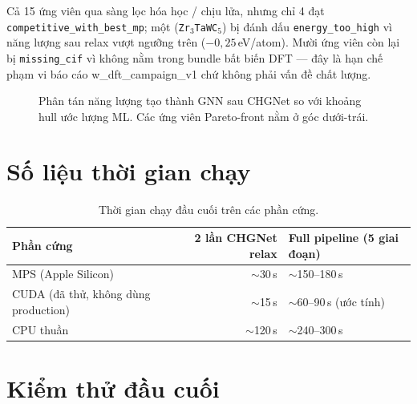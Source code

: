 \documentclass[11pt,a4paper]{report}
\newcommand{\eV}{eV/atom}
\begin{document}
Cả 15 ứng viên qua sàng lọc hóa học / chịu lửa, nhưng chỉ 4 đạt \texttt{competitive\_with\_best\_mp};
một (\texttt{Zr$_3$TaWC$_5$}) bị đánh dấu \texttt{energy\_too\_high} vì năng lượng sau relax vượt
ngưỡng trên ($-0{,}25$\,\eV{}). Mười ứng viên còn lại bị \texttt{missing\_cif} vì không nằm
trong bundle bất biến DFT — đây là hạn chế phạm vi báo cáo w\_dft\_campaign\_v1 chứ không
phải vấn đề chất lượng.

\begin{figure}[h]
\centering
{}
\caption{Phân tán năng lượng tạo thành GNN sau CHGNet so với khoảng hull ước lượng ML.
  Các ứng viên Pareto-front nằm ở góc dưới-trái.}
\label{fig:scatter}
\end{figure}

\section{Số liệu thời gian chạy}

\begin{table}[h]
\centering
\caption{Thời gian chạy đầu cuối trên các phần cứng.}
\label{tab:runtime}
\begin{tabular}{lrl}
\toprule
\textbf{Phần cứng} & \textbf{2 lần CHGNet relax} & \textbf{Full pipeline (5 giai đoạn)} \\
\midrule
MPS (Apple Silicon) & $\sim$30\,s & $\sim$150--180\,s \\
CUDA (đã thử, không dùng production) & $\sim$15\,s & $\sim$60--90\,s (ước tính) \\
CPU thuần & $\sim$120\,s & $\sim$240--300\,s \\
\bottomrule
\end{tabular}
\end{table}

\section{Kiểm thử đầu cuối}
\end{document}
